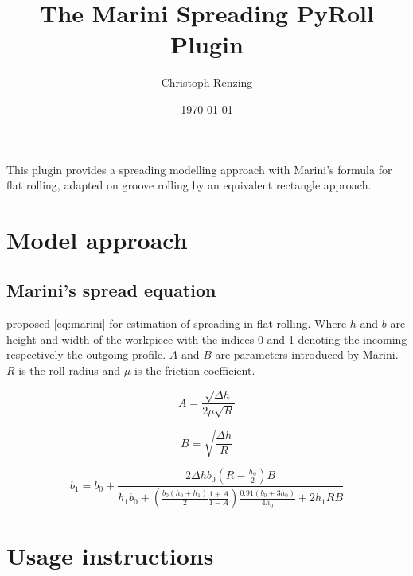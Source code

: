 \documentclass[11pt]{PyRollDocs}
\begin{document}
    \title{The Marini Spreading PyRoll Plugin}
    \author{Christoph Renzing}
    \date{\today}

    \maketitle

    This plugin provides a spreading modelling approach with Marini's formula for flat rolling, adapted on groove rolling by an equivalent rectangle approach.


    \section{Model approach}\label{sec:model-approach}

    \subsection{Marini's spread equation}\label{subsec:marinis's-spread-equation}

    \textcite{Marini1941} proposed \autoref{eq:marini} for estimation of spreading in flat rolling.
    Where $h$ and $b$ are height and width of the workpiece with the indices 0 and 1 denoting the incoming respectively the outgoing profile.
    $A$ and $B$ are parameters introduced by Marini.
    $R$ is the roll radius and $\mu$ is the friction coefficient.


    \begin{equation}
        A = \frac{\sqrt{\Delta h}}{2 \mu \sqrt{R}}
        \label{eq:marini-parameter-a}
    \end{equation}

    \begin{equation}
        B = \sqrt{\frac{\Delta h}{R}}
        \label{eq:marini-parameter-b}
    \end{equation}

    \begin{equation}
        b_1 = b_0 + \frac{2 \Delta h b_0 \left( R - \frac{h_0}{2} \right) B }{h_1 b_0 + \left( \frac{b_0 \left( h_0 + h_1 \right)}{2} \frac{1 + A}{1 - A} \right) \frac{0.91 \left( b_0 + 3 h_0 \right)}{4 h_0} + 2 h_1 R B}
        \label{eq:marini}
    \end{equation}


    \section{Usage instructions}\label{sec:usage-instructions}
\end{document}
